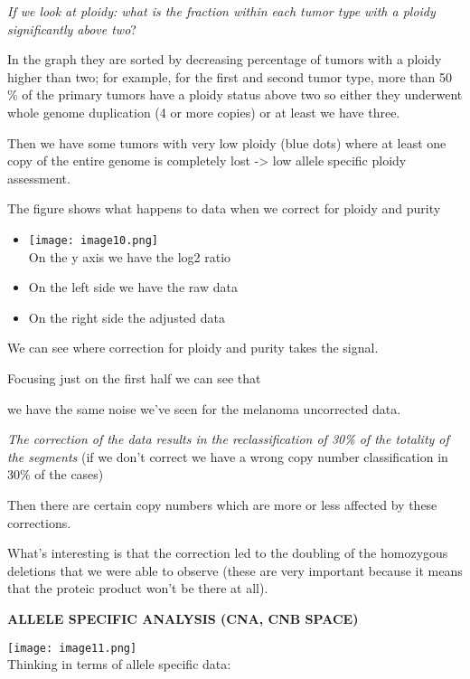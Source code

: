 \emph{If we look at ploidy: what is the fraction within each tumor type with a
ploidy significantly above two}?

In the graph they are sorted by decreasing percentage of tumors with a ploidy
higher than two; for example, for the first and second tumor type, more than 50
\% of the primary tumors have a ploidy status above two so either they underwent
whole genome duplication (4 or more copies) or at least we have three.

Then we have some tumors with very low ploidy (blue dots) where at least one
copy of the entire genome is completely lost -\textgreater{} low allele specific
ploidy assessment.

The figure shows what happens to data when we correct for ploidy and purity

\begin{itemize}
\item
  \texttt{[image: image10.png]}\\
  On the y axis
  we have the log2 ratio
\item
  On the left side we have the raw data
\item
  On the right side the adjusted data
\end{itemize}

We can see where correction for ploidy and purity takes the signal.

Focusing just on the first half we can see that

we have the same noise we've seen for the melanoma uncorrected data.

\emph{The correction of the data results in the reclassification of 30\% of the
totality of the segments} (if we don't correct we have a wrong copy number
classification in 30\% of the cases)

Then there are certain copy numbers which are more or less affected by these
corrections.

What's interesting is that the correction led to the doubling of the homozygous
deletions that we were able to observe (these are very important because it
means that the proteic product won't be there at all).

\textbf{ALLELE SPECIFIC ANALYSIS (CNA, CNB SPACE)}

\texttt{[image: image11.png]}\\

Thinking in terms of allele specific data:

